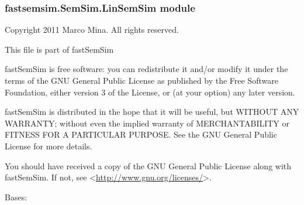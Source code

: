 \documentclass[letterpaper,10pt,english]{sphinxmanual}
\begin{document}
\subsubsection{fastsemsim.SemSim.LinSemSim module}
\label{fastsemsim.SemSim:module-fastsemsim.SemSim.LinSemSim}\label{fastsemsim.SemSim:fastsemsim-semsim-linsemsim-module}
Copyright 2011 Marco Mina. All rights reserved.

This file is part of fastSemSim

fastSemSim is free software: you can redistribute it and/or modify
it under the terms of the GNU General Public License as published by
the Free Software Foundation, either version 3 of the License, or
(at your option) any later version.

fastSemSim is distributed in the hope that it will be useful,
but WITHOUT ANY WARRANTY; without even the implied warranty of
MERCHANTABILITY or FITNESS FOR A PARTICULAR PURPOSE.  See the
GNU General Public License for more details.

You should have received a copy of the GNU General Public License
along with fastSemSim.  If not, see \textless{}\href{http://www.gnu.org/licenses/}{http://www.gnu.org/licenses/}\textgreater{}.

\begin{fulllineitems}
\label{fastsemsim.SemSim:fastsemsim.SemSim.LinSemSim.LinSemSim}
Bases: {\hyperref[fastsemsim.SemSim:fastsemsim.SemSim.TermSemSim.TermSemSim]{}}

\begin{fulllineitems}
\label{fastsemsim.SemSim:fastsemsim.SemSim.LinSemSim.LinSemSim.IC_based}
\end{fulllineitems}


\begin{fulllineitems}
\label{fastsemsim.SemSim:fastsemsim.SemSim.LinSemSim.LinSemSim.SS_type}
\end{fulllineitems}


\end{fulllineitems}
\end{document}
